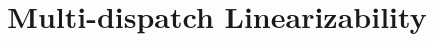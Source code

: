 \usepackage{filecontents}
\usepackage{float}
\usepackage{graphicx}
\usepackage[font=small,skip=1pt]{caption}

\usepackage{algorithmicx}
\usepackage[linesnumbered,ruled]{algorithm2e}
\usepackage{multicol}





\date{}

\title{\Large \bf Multi-dispatch Linearizability}


\maketitle









